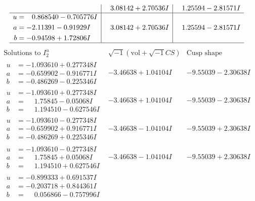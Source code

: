 \documentclass[1p]{elsarticle_modified}
\theoremstyle{definition}
\newcommand{\I}{\sqrt{-1}}
\begin{document}
$$\begin{array}{c|c|c}
 & \phantom{-}3.08142 + 2.70536 I & \phantom{-}1.25594 - 2.81571 I \\ \hline\begin{aligned}
u &= \phantom{-}0.868540 - 0.705776 I \\
a &= -2.11391 - 0.91929 I \\
b &= -0.94598 + 1.72806 I\end{aligned}
 & \phantom{-}3.08142 + 2.70536 I & \phantom{-}1.25594 - 2.81571 I\\
 \hline 
 \end{array}$$\newpage$$\begin{array}{c|c|c}  
\text{Solutions to }I^u_{2}& \I (\text{vol} + \sqrt{-1}CS) & \text{Cusp shape}\\
 \hline 
\begin{aligned}
u &= -1.093610 + 0.277348 I \\
a &= -0.659902 - 0.916771 I \\
b &= -0.486269 - 0.225346 I\end{aligned}
 & -3.46638 + 1.04104 I & -9.55039 - 2.30638 I \\ \hline\begin{aligned}
u &= -1.093610 + 0.277348 I \\
a &= \phantom{-}1.75845 - 0.05068 I \\
b &= \phantom{-}1.194510 - 0.627546 I\end{aligned}
 & -3.46638 + 1.04104 I & -9.55039 - 2.30638 I \\ \hline\begin{aligned}
u &= -1.093610 - 0.277348 I \\
a &= -0.659902 + 0.916771 I \\
b &= -0.486269 + 0.225346 I\end{aligned}
 & -3.46638 - 1.04104 I & -9.55039 + 2.30638 I \\ \hline\begin{aligned}
u &= -1.093610 - 0.277348 I \\
a &= \phantom{-}1.75845 + 0.05068 I \\
b &= \phantom{-}1.194510 + 0.627546 I\end{aligned}
 & -3.46638 - 1.04104 I & -9.55039 + 2.30638 I \\ \hline\begin{aligned}
u &= -0.899333 + 0.691537 I \\
a &= -0.203718 + 0.844361 I \\
b &= \phantom{-}0.056866 - 0.757996 I\end{aligned}

\end{array}$$
\end{document}
